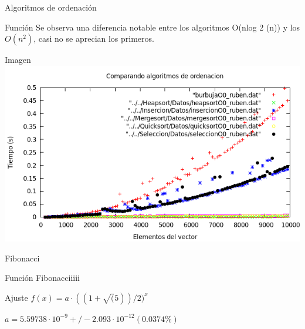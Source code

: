 \documentclass[compress]{beamer}
\begin{document}
\begin{frame}{Algoritmos de ordenación}
	\begin{block}{Función}
	Se observa una diferencia notable entre los algoritmos O(nlog 2 (n)) y los
	$O(n^2)$, casi no se aprecian los primeros.
	\end{block}

	\begin{alertblock}{Imagen}
	\includegraphics[scale=0.55]{../Graficas/todos.png}
	\end{alertblock}
\end{frame}





\begin{frame}{Fibonacci}
	\begin{block}{Función}
		Fibonacciiiii
	\end{block}
	
	\begin{block}{Ajuste}
	$ f(x) = a\cdot ((1+\sqrt(5))/2)^x $

	$a               = 5.59738\cdot 10^{-9}      +/- 2.093\cdot 10^{-12}    (0.0374\%)$
	\end{block}
\end{frame}
\end{document}
